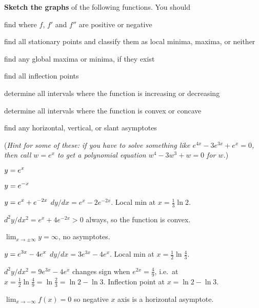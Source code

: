 \begin{multicols}{2}
\noindent\textbf{Sketch the graphs} of the following functions.
You should
\begin{list}{--}{
    \setlength{\itemindent}{0pt}
    \setlength{\leftmargin}{6pt}}
\item find where $f$, $f'$ and $f''$ are positive or negative
\item find all stationary points and classify them as local minima, maxima, or neither
\item find any global maxima or minima, if they exist
\item find all inflection points
\item determine all intervals where the function is increasing or decreasing
\item determine all intervals where the function is convex or concave
\item find any horizontal, vertical, or slant asymptotes
\end{list}



(\textit{Hint for some of these:  if you have to solve something like
  $e^{4x}-3e^{3x}+e^x = 0$, then call $w=e^x$ to get a polynomial
  equation $w^4-3w^3+w=0$ for $w$.})




\problem $\displaystyle y= e^x $ %




\problem $\displaystyle y= e^{-x} $ %




\problem $\displaystyle y= e^{x}+e^{-2x} $ %
\answer %
$dy/dx = e^x - 2e^{-2x}$. Local min at $x = \frac13 \ln 2$.




$d^2y/dx^2 = e^x+4e^{-2x}>0$ always, so the function is convex.




$\lim_{x\to\pm\infty} y=\infty$, no asymptotes.
\endanswer




\problem $\displaystyle y= e^{3x}-4e^x $ %
\answer %
$dy/dx = 3e^{3x} - 4 e^x$. Local min at $x=\frac12\ln\frac43$.




$d^2y/dx^2 = 9e^{3x} - 4e^{x}$ changes sign when $e^{2x} = \frac49$,
i.e.~at $x=\frac12\ln\frac49 = \ln\frac23 = \ln2-\ln3$.  Inflection
point at $x=\ln2-\ln 3$.




$\lim_{x\to-\infty}f(x) = 0$ so negative $x$ axis is a horizontal
asymptote.





\end{multicols}
